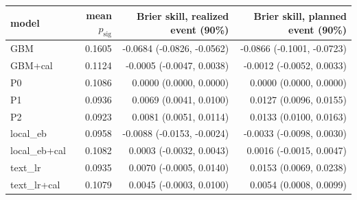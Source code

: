 \begin{tabular}{lrrr}
\toprule
model & mean $p_{\mathrm{sig}}$ & Brier skill, realized event (90\%) & Brier skill, planned event (90\%) \\
\midrule
GBM & 0.1605 & -0.0684 (-0.0826, -0.0562) & -0.0866 (-0.1001, -0.0723) \\
GBM+cal & 0.1124 & -0.0005 (-0.0047, 0.0038) & -0.0012 (-0.0052, 0.0033) \\
P0 & 0.1086 & 0.0000 (0.0000, 0.0000) & 0.0000 (0.0000, 0.0000) \\
P1 & 0.0936 & 0.0069 (0.0041, 0.0100) & 0.0127 (0.0096, 0.0155) \\
P2 & 0.0923 & 0.0081 (0.0051, 0.0114) & 0.0133 (0.0100, 0.0163) \\
local\_eb & 0.0958 & -0.0088 (-0.0153, -0.0024) & -0.0033 (-0.0098, 0.0030) \\
local\_eb+cal & 0.1082 & 0.0003 (-0.0032, 0.0043) & 0.0016 (-0.0015, 0.0047) \\
text\_lr & 0.0935 & 0.0070 (-0.0005, 0.0140) & 0.0153 (0.0069, 0.0238) \\
text\_lr+cal & 0.1079 & 0.0045 (-0.0003, 0.0100) & 0.0054 (0.0008, 0.0099) \\
\bottomrule
\end{tabular}
